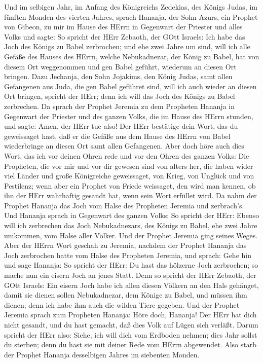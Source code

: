  Und im selbigen Jahr, im Anfang des Königreichs Zedekias,
des Königs Judas, im fünften Monden des vierten Jahres, sprach Hananja,
der Sohn Azurs, ein Prophet von Gibeon, zu mir im Hause des HErrn in
Gegenwart der Priester und alles Volks und sagte:  So
spricht der HErr Zebaoth, der GOtt Israels: Ich habe das Joch des Königs
zu Babel zerbrochen;  und ehe zwei Jahre um sind, will ich
alle Gefäße des Hauses des HErrn, welche Nebukadnezar, der König zu
Babel, hat von diesem Ort weggenommen und gen Babel geführt, wiederum an
diesen Ort bringen.  Dazu Jechanja, den Sohn Jojakims, den
König Judas, samt allen Gefangenen aus Juda, die gen Babel geführet
sind, will ich auch wieder an diesen Ort bringen, spricht der HErr; denn
ich will das Joch des Königs zu Babel zerbrechen.  Da sprach
der Prophet Jeremia zu dem Propheten Hananja in Gegenwart der Priester
und des ganzen Volks, die im Hause des HErrn stunden,  und
sagte: Amen, der HErr tue also! Der HErr bestätige dein Wort, das du
geweissaget hast, daß er die Gefäße aus dem Hause des HErrn von Babel
wiederbringe an diesen Ort samt allen Gefangenen.  Aber doch
höre auch dies Wort, das ich vor deinen Ohren rede und vor den Ohren des
ganzen Volks:  Die Propheten, die vor mir und vor dir
gewesen sind von alters her, die haben wider viel Länder und große
Königreiche geweissaget, von Krieg, von Unglück und von Pestilenz;
 wenn aber ein Prophet von Friede weissaget, den wird man
kennen, ob ihn der HErr wahrhaftig gesandt hat, wenn sein Wort erfüllet
wird.  Da nahm der Prophet Hananja das Joch vom Halse des
Propheten Jeremia und zerbrach's.  Und Hananja sprach in
Gegenwart des ganzen Volks: So spricht der HErr: Ebenso will ich
zerbrechen das Joch Nebukadnezars, des Königs zu Babel, ehe zwei Jahre
umkommen, vom Halse aller Völker. Und der Prophet Jeremia ging seines
Weges.  Aber der HErrn Wort geschah zu Jeremia, nachdem der
Prophet Hananja das Joch zerbrochen hatte vom Halse des Propheten
Jeremia, und sprach:  Gehe hin und sage Hananja: So spricht
der HErr: Du hast das hölzerne Joch zerbrochen; so mache nun ein eisern
Joch an jenes Statt.  Denn so spricht der HErr Zebaoth, der
GOtt Israels: Ein eisern Joch habe ich allen diesen Völkern an den Hals
gehänget, damit sie dienen sollen Nebukadnezar, dem Könige zu Babel, und
müssen ihm dienen; denn ich habe ihm auch die wilden Tiere gegeben.
 Und der Prophet Jeremia sprach zum Propheten Hananja: Höre
doch, Hananja! Der HErr hat dich nicht gesandt, und du hast gemacht, daß
dies Volk auf Lügen sich verläßt.  Darum spricht der HErr
also: Siehe, ich will dich vom Erdboden nehmen; dies Jahr sollst du
sterben; denn du hast sie mit deiner Rede vom HErrn abgewendet.
 Also starb der Prophet Hananja desselbigen Jahres im
siebenten Monden.

